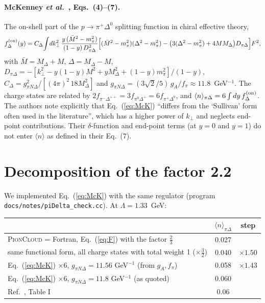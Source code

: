 \documentclass[11pt,a4paper]{article}
\newcommand{\picloud}{\textsc{PionCloud}}
\newcommand{\kT}{k_\perp}
\begin{document}
\paragraph{McKenney \textit{et al.}~\cite{McK16}, Eqs.~(4)--(7).}  The
on-shell part of the $p\to\pi^+\Delta^0$ splitting function in chiral
effective theory,
\begin{equation}
f^{\rm (on)}_{\Delta}(y)=C_\Delta\!\int\! d\kT^2\,
\frac{y\,(\bar M^2-m_\pi^2)}{(1-y)\,D_{\pi\Delta}^2}
\Big[(\bar M^2-m_\pi^2)(\Delta^2-m_\pi^2)-\big(3(\Delta^2-m_\pi^2)+4MM_\Delta\big)D_{\pi\Delta}\Big]F^2,
\label{eq:McK}
\end{equation}
with $\bar M=M_\Delta+M$, $\Delta=M_\Delta-M$,
$D_{\pi\Delta}=-[\kT^2-y(1-y)M^2+yM_\Delta^2+(1-y)m_\pi^2]/(1-y)$,
$C_\Delta=g_{\pi N\Delta}^2/[(4\pi)^2\,18M_\Delta^2]$ and
$g_{\pi N\Delta}=(3\sqrt2/5)\,g_A/f_\pi\approx11.8$~GeV$^{-1}$.  The charge states
are related by $2f_{\pi^-\Delta^{++}}=3f_{\pi^0\Delta^+}=6f_{\pi^+\Delta^0}$,
and $\langle n\rangle_{\pi\Delta}=6\int dy\,f^{\rm (on)}_\Delta$.
The authors note explicitly that Eq.~(\ref{eq:McK}) ``differs from the
`Sullivan' form often used in the literature'', which has a higher power of
$\kT$ and neglects end-point contributions.  Their $\delta$-function and
end-point terms (at $y=0$ and $y=1$) do not enter $\langle n\rangle$ as
defined in their Eq.~(7).

\section{Decomposition of the factor 2.2}

We implemented Eq.~(\ref{eq:McK}) with the same regulator (program
\texttt{docs/notes/piDelta\_check.cc}).  At $\Lambda=1.33$~GeV:

\begin{center}
\begin{tabular}{lcc}
\toprule
 & $\langle n\rangle_{\pi\Delta}$ & step \\
\midrule
\picloud{} = Fortran, Eq.~(\ref{eq:F}) with the factor $\tfrac23$ & 0.027 & \\
same functional form, all charge states with total weight 1 ($\times\tfrac32$) & 0.040 & $\times1.50$ \\
Eq.~(\ref{eq:McK}) $\times6$, $g_{\pi N\Delta}=11.56$ GeV$^{-1}$ (from $g_A, f_\pi$) & 0.058 & $\times1.43$ \\
Eq.~(\ref{eq:McK}) $\times6$, $g_{\pi N\Delta}=11.8$ GeV$^{-1}$ (as quoted) & 0.060 & \\
Ref.~\cite{McK16}, Table I & 0.06 & \\
\bottomrule
\end{tabular}
\end{center}
\end{document}

